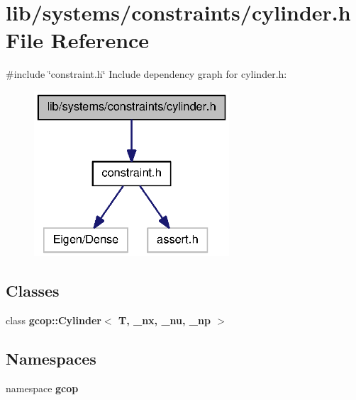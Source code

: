 \section{lib/systems/constraints/cylinder.h \-File \-Reference}
\label{cylinder_8h}
{\ttfamily \#include \char`\"{}constraint.\-h\char`\"{}}\*
\-Include dependency graph for cylinder.\-h\-:
\nopagebreak
\begin{figure}[H]
\begin{center}
\leavevmode
\includegraphics[width=206pt]{cylinder_8h__incl}
\end{center}
\end{figure}
\subsection*{\-Classes}
\begin{DoxyCompactItemize}
\item 
class {\bf gcop\-::\-Cylinder$<$ T, \-\_\-nx, \-\_\-nu, \-\_\-np $>$}
\end{DoxyCompactItemize}
\subsection*{\-Namespaces}
\begin{DoxyCompactItemize}
\item 
namespace {\bf gcop}
\end{DoxyCompactItemize}
